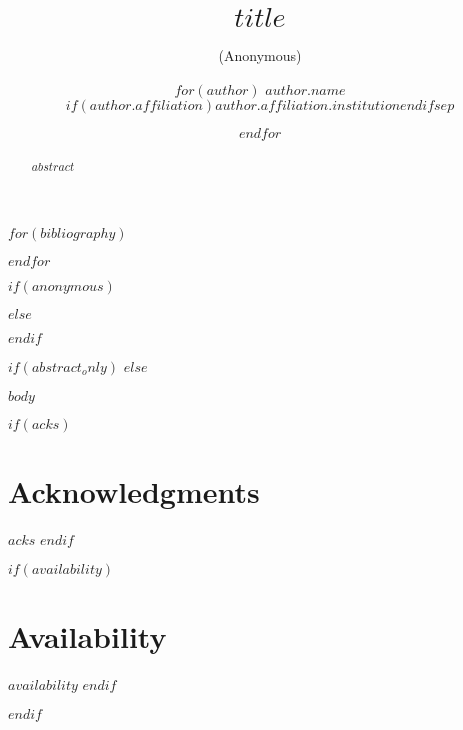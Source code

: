 \RequirePackage[
  datamodel=acmdatamodel,
  style=acmnumeric, %
]{biblatex}
$for(bibliography)$

$endfor$

\date{}

\title{\Large \bf $title$}

$if(anonymous)$
\author{(Anonymous)}
$else$
\author{
$for(author)$
{\rm $author.name$}\\
$if(author.affiliation)$$author.affiliation.institution$$endif$$sep$
\and
$endfor$
}
$endif$

\providecommand{\tightlist}{%
  \setlength{\itemsep}{0pt}\setlength{\parskip}{0pt}}



\maketitle

\begin{abstract}
$abstract$
\end{abstract}

$if(abstract_only)$
$else$

$body$

$if(acks)$
\section*{Acknowledgments}
$acks$
$endif$

$if(availability)$
\section*{Availability}
$availability$
$endif$

\printbibliography
% 
% 

$endif$


